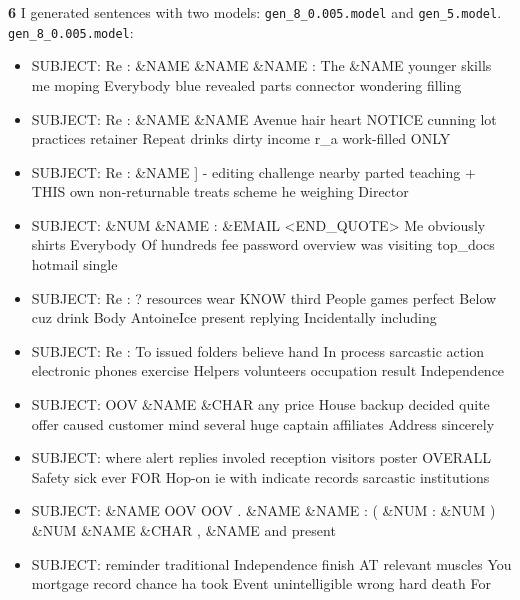 \documentclass{article}
\begin{document}
\pagebreak

\textbf{6} I generated sentences with two models: \texttt{gen\_8\_0.005.model} and \texttt{gen\_5.model}. \\

\texttt{gen\_8\_0.005.model}:
\begin{itemize}
	\item SUBJECT: Re : \&NAME \&NAME \&NAME : The \&NAME younger skills me moping Everybody blue revealed parts connector wondering filling
	\item SUBJECT: Re : \&NAME \&NAME Avenue hair heart NOTICE cunning lot practices retainer Repeat drinks dirty income r\_a work-filled ONLY
	\item SUBJECT: Re : \&NAME ] - editing challenge nearby parted teaching + THIS own non-returnable treats scheme he weighing Director
	\item SUBJECT: \&NUM \&NAME : \&EMAIL <END\_QUOTE> Me obviously shirts Everybody Of hundreds fee password overview was visiting top\_docs hotmail single
	\item SUBJECT: Re : ? resources wear KNOW third People games perfect Below cuz drink Body AntoineIce present replying Incidentally including
	\item SUBJECT: Re : To issued folders believe hand In process sarcastic action electronic phones exercise Helpers volunteers occupation result Independence
	\item SUBJECT: OOV \&NAME \&CHAR any price House backup decided quite offer caused customer mind several huge captain affiliates Address sincerely
	\item SUBJECT: where alert replies involed reception visitors poster OVERALL Safety sick ever FOR Hop-on ie with indicate records sarcastic institutions
	\item SUBJECT: \&NAME OOV OOV . \&NAME \&NAME : ( \&NUM : \&NUM ) \&NUM \&NAME \&CHAR , \&NAME and present
	\item SUBJECT: reminder traditional Independence finish AT relevant muscles You mortgage record chance ha took Event unintelligible wrong hard death For
\end{itemize}
\end{document}
